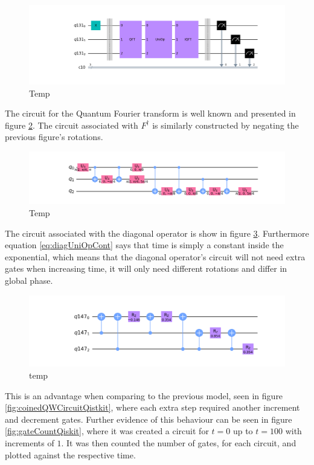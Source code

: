 \documentclass[../../dissertation.tex]{subfiles}
\begin{document}
\begin{figure}[!h]
	\centering
	\includegraphics[scale=0.30]{img/Qiskit/ContQuantumWalk/Circuits/circContQW_N3_S1.png}
	\caption{Temp} 
	\label{fig:contQWCircuitQistkit}
\end{figure}
The circuit for the Quantum Fourier transform is well known and presented in figure \ref{fig:qftCircuitQiskit}. The circuit associated with $F^{\dagger}$ is similarly constructed by negating the previous figure's rotations.\par
\begin{figure}[!h]
	\centering
	\includegraphics[scale=0.30]{img/Qiskit/ContQuantumWalk/Circuits/circQft_N3_S1.png}
	\caption{Temp} 
	\label{fig:qftCircuitQiskit}
\end{figure}
The circuit associated with the diagonal operator is show in figure \ref{fig:diagCircuitQiskit}. Furthermore equation \ref{eq:diagUniOpCont} says that time is simply a constant inside the exponential, which means that the diagonal operator's circuit will not need extra gates when increasing time, it will only need different rotations and differ in global phase. 
\begin{figure}[!h]
	\centering
	\includegraphics[scale=0.30]{img/Qiskit/ContQuantumWalk/Circuits/circDiag_N3_S1.png}
	\caption{temp}
	\label{fig:diagCircuitQiskit}
\end{figure}
This is an advantage when comparing to the previous model, seen in figure \ref{fig:coinedQWCircuitQistkit}, where each extra step required another increment and decrement gates.  Further evidence of this behaviour can be seen in figure \ref{fig:gateCountQiskit}, where it was created a circuit for $t=0$ up to $t=100$ with increments of $1$. It was then counted the number of gates, for each circuit, and plotted against the respective time. 
\end{document}
